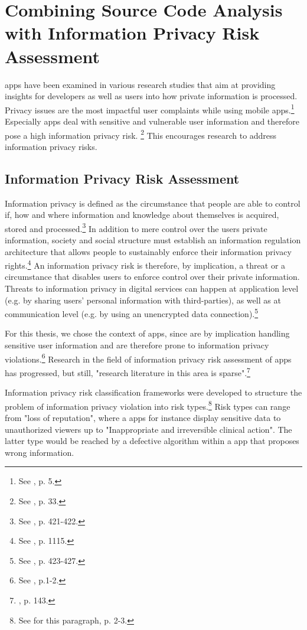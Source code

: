 \section{Combining Source Code Analysis with Information Privacy Risk Assessment}

\mH apps have been examined in various research studies that aim at providing insights for developers as well as users into how private information is processed.
Privacy issues are the most impactful user complaints while using mobile apps.\footnote{See \cite{Khalid2015}, p. 5.}
Especially \mH apps deal with sensitive and vulnerable user information and therefore pose a high information privacy risk. \footnote{See \cite{Kumar2013}, p. 33.}
This encourages research to address information privacy risks.

\subsection{Information Privacy Risk Assessment}

Information privacy is defined as the circumstance that people are able to control if, how and where information and knowledge about themselves is acquired, stored and processed.\footnote{See \cite{Fischer1998}, p. 421-422.}
In addition to mere control over the users private information, society and social structure must establish an information regulation architecture that allows people to sustainably enforce their information privacy rights.\footnote{See \cite{Solove2002}, p. 1115.}
An information privacy risk is therefore, by implication, a threat or a circumstance that disables users to enforce control over their private information.
Threats to information privacy in digital services can happen at application level (e.g. by sharing users' personal information with third-parties), as well as at communication level (e.g. by using an unencrypted data connection).\footnote{See \cite{Fischer1998}, p. 423-427.}

For this thesis, we chose the context of \mH apps, since \mH are by implication handling sensitive user information and are therefore prone to information privacy violations.\footnote{See \cite{Huckvalue2015}, p.1-2.}
Research in the field of information privacy risk assessment of \mH apps has progressed, but still, "research literature in this area is sparse".\footnote{\cite{Arora2014}, p. 143.}

Information privacy risk classification frameworks were developed to structure the problem of information privacy violation into risk types.\footnote{See for this paragraph\cite{Lewis2015}, p. 2-3.}
Risk types can range from "loss of reputation", where a \mH apps for instance display sensitive data to unauthorized viewers up to "Inappropriate and irreversible clinical action". 
The latter type would be reached by a defective algorithm within a \mH app that proposes wrong information.

